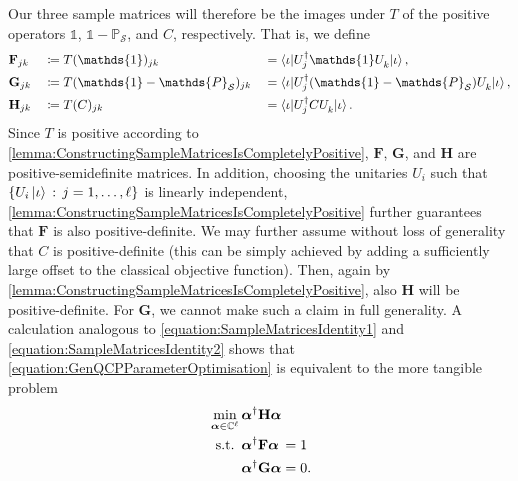 \documentclass[10pt,conference]{IEEEtran}
\newcommand*{\C}{\mathbb{C}}          %
\newcommand*{\defcolon}{\,:\,}        %
\newcommand*{\solspace}{\mathcal{S}}  %
\newcommand*{\one}{\mathds{1}}        %
\newcommand*{\projection}{\mathds{P}} %
\newcommand*{\mathhphantomdisplay}[2]{\mathmakebox[\widthof{$\displaystyle #1$}][l]{#2}}
\begin{document}
Our three sample matrices will therefore be the images under $T$ of the positive operators $\one$, $\one - \projection_{\solspace}$, and $C$, respectively.
That is, we define
\begin{alignat*}{3}
    &\mathbf{F}_{j k} &&\coloneqq T(\one)_{j k} &&= \braket{\iota | U_{j}^{\dagger} \one U_{k}^{\vphantom{\dagger}} | \iota}, \\
    &\mathbf{G}_{j k} &&\coloneqq T(\one - \projection_{\solspace})_{j k} &&= \braket{\iota | U_{j}^{\dagger} (\one - \projection_{\solspace}) U_{k}^{\vphantom{\dagger}} | \iota}, \\
    &\mathbf{H}_{j k} &&\coloneqq T(C)_{j k} &&= \braket{\iota | U_{j}^{\dagger} C U_{k}^{\vphantom{\dagger}} | \iota}.
\end{alignat*}
Since $T$ is positive according to \autoref{lemma:ConstructingSampleMatricesIsCompletelyPositive}, $\mathbf{F}$, $\mathbf{G}$, and $\mathbf{H}$ are positive-semidefinite matrices.
In addition, choosing the unitaries $U_{i}$ such that $\{U_{i} \ket{\iota} \defcolon j = 1, \ldots, \ell\}$ is linearly independent, \autoref{lemma:ConstructingSampleMatricesIsCompletelyPositive} further guarantees that $\mathbf{F}$ is also positive-definite.
We may further assume without loss of generality that $C$ is positive-definite (this can be simply achieved by adding a sufficiently large offset to the classical objective function).
Then, again by \autoref{lemma:ConstructingSampleMatricesIsCompletelyPositive}, also $\mathbf{H}$ will be positive-definite.
For $\mathbf{G}$, we cannot make such a claim in full generality.
A calculation analogous to \eqref{equation:SampleMatricesIdentity1} and \eqref{equation:SampleMatricesIdentity2} shows that \eqref{equation:GenQCPParameterOptimisation} is equivalent to the more tangible problem
\begin{align}\label{equation:GenQCPMatrixParameterOptimisation}
    \begin{split}
        &\min_{\bm{\alpha} \in \C^{\ell}} \bm{\alpha}^{\dagger} \mathbf{H} \bm{\alpha} \\
        &\mathhphantomdisplay{\min_{\bm{\alpha} \in \C^{\ell}}}{\ \,\text{s.t.}}\ \mathhphantomdisplay{\bm{\alpha}^{\dagger} \mathbf{G} \bm{\alpha}}{\bm{\alpha}^{\dagger} \mathbf{F} \bm{\alpha}} = 1 \\
        &\hphantom{\min_{\bm{\alpha} \in \C^{\ell}}}\ \bm{\alpha}^{\dagger} \mathbf{G} \bm{\alpha} = 0.
    \end{split}
\end{align}
\end{document}
